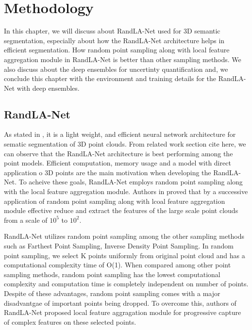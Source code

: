 
\chapter{Methodology}
In this chapter, we will discuss about RandLA-Net used for 3D semantic segmentation, 
especially about how the RandLA-Net architecture helps in efficient segmentation.
How random point sampling along with local feature aggregation module in RandLA-Net is better than other sampling methods.
We also discuss about the deep ensembles for uncertinty quantification and, we conclude this chapter with the environment and training details for the RandLA-Net with deep ensembles.
\section{RandLA-Net}
As stated in \cite{Hu_2020_CVPR_Randla}, it is a light weight, and efficient neural network architecture for sematic segmentation of 3D point clouds.
From related work section cite here, we can observe that the RandLA-Net architecture is best performing among the point models.
Efficient computation, memory usage and a model with direct application o 3D points are the main motivation when developing the RandLA-Net.
To acheive these goals, RandLA-Net employs random point sampling along with the local feature aggregation module.
Authors in \cite{Hu_2020_CVPR_Randla} proved that by a successive application of random point sampling along with lcoal feature aggregation module effective reduce and extract the features of the large scale point clouds from a scale of $10^5$ to $10^2$.

RandLA-Net utilizes random point sampling among the other sampling methods such as Farthest Point Sampling, Inverse Density Point Sampling.
In random point sampling, we select K points uniformly from original point cloud and has a computational complexity time of O(1).
When compared among other point sampling methods, random point sampling has the lowest computational complexity and computation time is completely independent on number of points.
Despite of these advantages, random point sampling comes with a major disadvantgae of important points being dropped.
To overcome this, authors of RandLA-Net proposed local feature aggragation module for progressive capture of complex features on these selected points.

